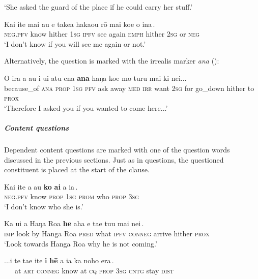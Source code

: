 \glt
‘She asked the guard of the place if he could carry her stuff.’ \textstyleExampleref{[R210.205]} 
\z

\ea\label{ex:10.71}
\gll Kai {\ꞌ}ite mai au {\ob}e take{\ꞌ}a haka{\ꞌ}ou rō mai koe {\ꞌ}o {\ꞌ}ina\,{\cb}. \\
\textsc{neg.pfv} know hither \textsc{1sg} {\db}\textsc{ipfv} see again \textsc{emph} hither \textsc{2sg} or \textsc{neg} \\

\glt 
‘I don’t know if you will see me again or not.’ \textstyleExampleref{[R210.072]} 
\z

Alternatively, the question is marked with the irrealis marker \textit{ana} ():

\ea\label{ex:10.73}
\gll {\ꞌ}O ira a au i {\ꞌ}ui atu ena {\ob}\textbf{ana} haŋa koe mo turu mai  ki nei...\,{\cb}\\
because\_of \textsc{ana} \textsc{prop} \textsc{1sg} \textsc{pfv} ask away \textsc{med} {\db}\textsc{irr} want \textsc{2sg} for go\_down hither  to \textsc{prox}\\

\glt 
‘Therefore I asked you if you wanted to come here...’ \textstyleExampleref{[R315.269]} 
\z

\subparagraph{Content questions} Dependent content questions are marked with one of the question words discussed in the previous sections. Just as in  questions, the questioned constituent is placed at the start of the clause.

\ea\label{ex:10.74}
\gll Kai {\ꞌ}ite a au {\ob}\textbf{ko} \textbf{ai} a ia\,{\cb}. \\
\textsc{neg.pfv} know \textsc{prop} \textsc{1sg} {\db}\textsc{prom} who \textsc{prop} \textsc{3sg} \\

\glt 
‘I don’t know who she is.’ \textstyleExampleref{[R413.356]} 
\z

\ea\label{ex:10.75}
\gll Ka u{\ꞌ}i a Haŋa Roa {\ob}\textbf{he} aha e ta{\ꞌ}e tu{\ꞌ}u mai nei\,{\cb}. \\
\textsc{imp} look by Hanga Roa {\db}\textsc{pred} what \textsc{ipfv} \textsc{conneg} arrive hither \textsc{prox} \\

\glt 
‘Look towards Hanga Roa why he is not coming.’ \textstyleExampleref{[R229.137]} 
\z

\ea\label{ex:10.76}
\gll ...{\ꞌ}i te ta{\ꞌ}e {\ꞌ}ite {\ob}\textbf{{\ꞌ}i} \textbf{hē} a ia ka noho era\,{\cb}. \\
~~~at \textsc{art} \textsc{conneg} know {\db}at \textsc{cq} \textsc{prop} \textsc{3sg} \textsc{cntg} stay \textsc{dist} \\


